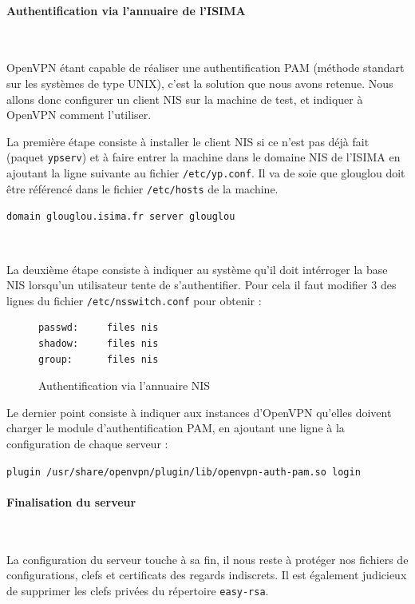 \paragraph{Authentification via l'annuaire de l'ISIMA}
~

OpenVPN étant capable de réaliser une authentification PAM (méthode standart sur les systèmes de type UNIX), c'est la solution que nous avons retenue. Nous allons donc configurer un client NIS sur la machine de test, et indiquer à OpenVPN comment l'utiliser.

La première étape consiste à installer le client NIS si ce n'est pas déjà fait (paquet \texttt{ypserv}) et à faire entrer la machine dans le domaine NIS de l'ISIMA en ajoutant la ligne suivante au fichier \verb|/etc/yp.conf|. Il va de soie que glouglou doit être référencé dans le fichier \verb|/etc/hosts| de la machine.

\verb|domain glouglou.isima.fr server glouglou|

~

La deuxième étape consiste à indiquer au système qu'il doit intérroger la base NIS lorsqu'un utilisateur tente de s'authentifier. Pour cela il faut modifier 3 des lignes du fichier \verb|/etc/nsswitch.conf| pour obtenir :

\begin{figure}[H]
	\begin{center}
		\begin{minipage}{0.90\textwidth}
			\begin{lstlisting}[frame=trBL]
passwd:     files nis
shadow:     files nis
group:      files nis
			\end{lstlisting}
		\end{minipage}
	\end{center}
	\caption{Authentification via l'annuaire NIS}
	\label{nsswitch_conf}
\end{figure}

Le dernier point consiste à indiquer aux instances d'OpenVPN qu'elles doivent charger le module d'authentification PAM, en ajoutant une ligne à la configuration de chaque serveur :

\verb|plugin /usr/share/openvpn/plugin/lib/openvpn-auth-pam.so login|


\paragraph{Finalisation du serveur}
~

La configuration du serveur touche à sa fin, il nous reste à protéger nos fichiers de configurations, clefs et certificats des regards indiscrets. Il est également judicieux de supprimer les clefs privées du répertoire \verb|easy-rsa|.


